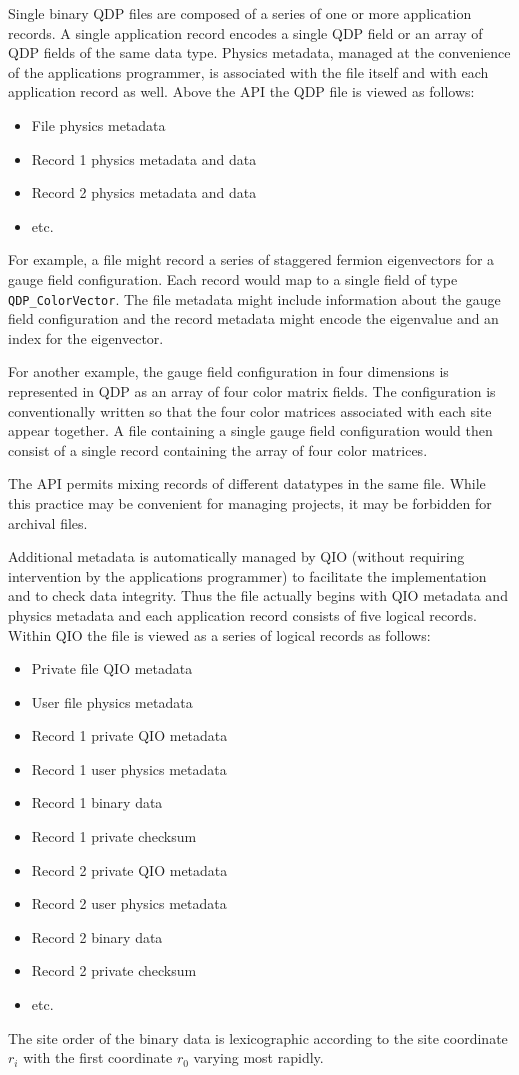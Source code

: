 \documentclass{article}
\begin{document}
Single binary QDP files are composed of a series of one or more
application records.  A single application record encodes a single QDP
field or an array of QDP fields of the same data type.  Physics
metadata, managed at the convenience of the applications programmer,
is associated with the file itself and with each application record as
well. Above the API the QDP file is viewed as follows:
%
\begin{itemize}
  \item File physics metadata
  \item Record 1 physics metadata and data
  \item Record 2 physics metadata and data
  \item etc.
\end{itemize}
%
For example, a file might record a series of staggered fermion
eigenvectors for a gauge field configuration.  Each record would map
to a single field of type \verb|QDP_ColorVector|.  The file metadata
might include information about the gauge field configuration and the
record metadata might encode the eigenvalue and an index for the
eigenvector.

For another example, the gauge field configuration in four dimensions
is represented in QDP as an array of four color matrix fields.  The
configuration is conventionally written so that the four color matrices
associated with each site appear together.  A file containing a single
gauge field configuration would then consist of a single record
containing the array of four color matrices.

The API permits mixing records of different datatypes in the same
file.  While this practice may be convenient for managing projects, it
may be forbidden for archival files.

Additional metadata is automatically managed by QIO (without requiring
intervention by the applications programmer) to facilitate the
implementation and to check data integrity.  Thus the file actually
begins with QIO metadata and physics metadata and each application
record consists of five logical records.  Within QIO the file is
viewed as a series of logical records as follows:
%
\begin{itemize}
  \item Private file QIO metadata
  \item User file physics metadata
  \item Record 1 private QIO metadata
  \item Record 1 user physics metadata
  \item Record 1 binary data
  \item Record 1 private checksum
  \item Record 2 private QIO metadata
  \item Record 2 user physics metadata
  \item Record 2 binary data
  \item Record 2 private checksum
  \item etc.
\end{itemize}
%
The site order of the binary data is lexicographic according to the
site coordinate $r_i$ with the first coordinate $r_0$ varying most
rapidly.
\end{document}
